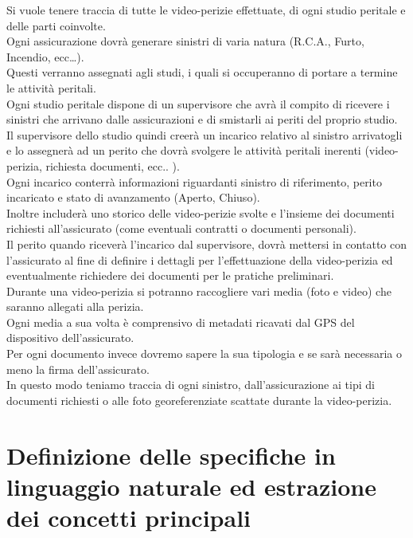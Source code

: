 \documentclass[a4paper,12pt]{report}
\begin{document}
Si vuole tenere traccia di tutte le video-perizie effettuate, di ogni studio peritale e delle parti coinvolte. 
\\
Ogni assicurazione dovrà generare sinistri di varia natura (R.C.A., Furto, Incendio, ecc…).
\\
Questi verranno assegnati agli studi, i quali si occuperanno di portare a termine le attività peritali.
\\
Ogni studio peritale dispone di un supervisore che avrà il compito di ricevere i sinistri che arrivano dalle assicurazioni e di smistarli ai periti del proprio studio.
\\
Il supervisore dello studio quindi creerà un incarico relativo al sinistro arrivatogli e lo assegnerà ad un perito che dovrà svolgere le attività peritali inerenti (video-perizia, richiesta documenti, ecc.. ).
\\
Ogni incarico conterrà informazioni riguardanti sinistro di riferimento, perito incaricato e stato di avanzamento (Aperto, Chiuso).
\\
Inoltre includerà uno storico delle video-perizie svolte e  l’insieme dei documenti richiesti all’assicurato (come eventuali contratti o documenti personali).
\\
Il perito quando riceverà l'incarico dal supervisore, dovrà mettersi in contatto con l'assicurato al fine di definire i dettagli per l'effettuazione della video-perizia ed eventualmente richiedere dei documenti per le pratiche preliminari.
\\
Durante una video-perizia si potranno raccogliere vari media (foto e video) che saranno allegati alla perizia.
\\
Ogni media a sua volta è comprensivo di metadati ricavati dal GPS del dispositivo dell’assicurato.
\\
Per ogni documento invece dovremo sapere la sua tipologia e se sarà necessaria o meno la firma dell’assicurato.
\\
In questo modo teniamo traccia di ogni sinistro, dall’assicurazione ai tipi di documenti richiesti o alle foto georeferenziate scattate durante la video-perizia.


\section{Definizione delle specifiche in linguaggio naturale ed estrazione dei concetti principali}
\end{document}
